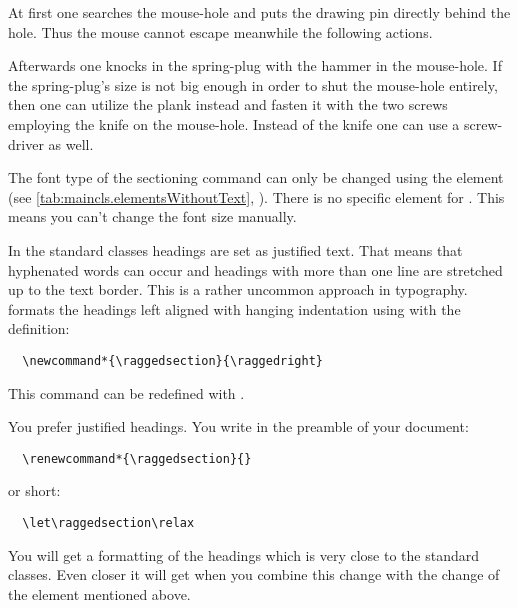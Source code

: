 \begin{Example}
\begin{ShowOutput}[\baselineskip]
  At first one searches the mouse-hole and puts the drawing pin
  directly behind the hole. Thus the mouse cannot escape
  meanwhile the following actions.

  Afterwards one knocks in the spring-plug with the hammer
  in the mouse-hole.
  If the spring-plug's size is not big enough in order to
  shut the mouse-hole entirely, then one can utilize
  the plank instead and fasten it with the two screws
  employing the knife on the mouse-hole.
  Instead of the knife one can use a screw-driver as well.
  \end{ShowOutput}
\end{Example}

The font type of the sectioning command  can only be
changed using the element
 (see
\autoref{tab:maincls.elementsWithoutText},
). There is no specific
element for . This means you can't change the font size
manually.
%
%


\begin{Declaration}
\end{Declaration}%
%
In the standard classes headings are set as justified text. That means
that hyphenated words can occur and headings with more than one line
are stretched up to the text border. This is a rather uncommon
approach in typography. {\KOMAScript} formats the headings left
aligned with hanging indentation using  with the
definition:
\begin{lstlisting}
  \newcommand*{\raggedsection}{\raggedright}
\end{lstlisting}
This command can be redefined with .
\begin{Example}
  You prefer justified headings. You write in the preamble of your document:
\begin{lstlisting}
  \renewcommand*{\raggedsection}{}
\end{lstlisting}
  or short:
\begin{lstlisting}
  \let\raggedsection\relax
\end{lstlisting}
  You will get a formatting of the headings which is very close to the
  standard classes. Even closer it will get when you combine this change
  with the change of the element
   mentioned
  above.
\end{Example}
%
%


